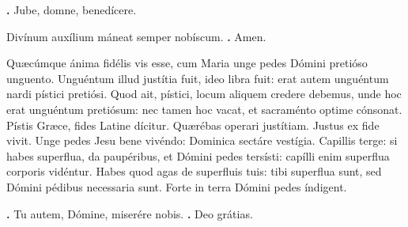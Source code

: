 \begin{small}
\textbf{\Vbar.} Jube, domne, benedícere.

Divínum auxílium máneat semper nobíscum. \textbf{\Rbar.} Amen.
\end{small}


Quæcúmque ánima fidélis vis esse, cum Maria unge pedes Dómini pretióso unguento. Unguéntum illud justítia fuit, ideo libra fuit: erat autem unguéntum nardi pístici pretiósi. Quod ait, pístici, locum aliquem credere debemus, unde hoc erat unguéntum pretiósum: nec tamen hoc vacat, et sacraménto optime cónsonat. Pístis Græce, fides Latine dícitur. Quærébas operari justítiam. Justus ex fide vivit. Unge pedes Jesu bene vivéndo: Dominica sectáre vestígia. Capillis terge: si habes superflua, da paupéribus, et Dómini pedes tersísti: capílli enim superflua corporis vidéntur. Habes quod agas de superfluis tuis: tibi superflua sunt, sed Dómini pédibus necessaria sunt. Forte in terra Dómini pedes índigent.

\textbf{\Vbar.} Tu autem, Dómine, miserére nobis.
\textbf{\Rbar.} Deo grátias.

